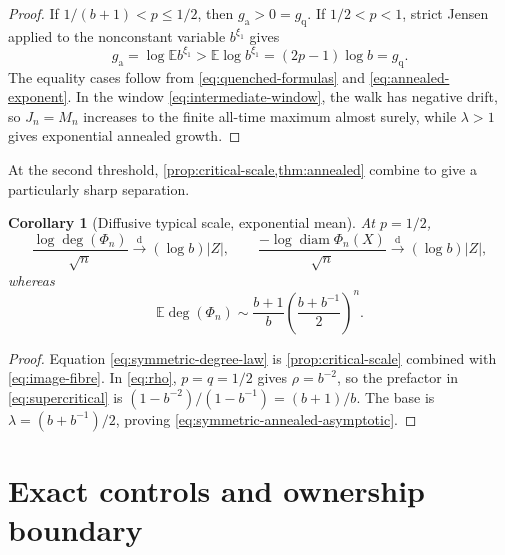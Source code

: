 \documentclass[11pt,a4paper]{amsart}
\newtheorem{corollary}[theorem]{Corollary}
\theoremstyle{definition}
\theoremstyle{remark}
\newcommand{\Exp}{\mathbb E}
\newcommand{\diam}{\operatorname{diam}}
\newcommand{\degf}{\operatorname{deg}}
\begin{document}
\begin{proof}
If $1/(b+1)<p\leq1/2$, then $g_{\mathrm a}>0=g_{\mathrm q}$.  If
$1/2<p<1$, strict Jensen applied to the nonconstant variable
$b^{\xi_1}$ gives
\[
 g_{\mathrm a}=\log\Exp b^{\xi_1}
 >\Exp\log b^{\xi_1}=(2p-1)\log b=g_{\mathrm q}.
\]
The equality cases follow from \eqref{eq:quenched-formulas} and
\eqref{eq:annealed-exponent}.  In the window
\eqref{eq:intermediate-window}, the walk has negative drift, so
$J_n=M_n$ increases to the finite all-time maximum almost surely, while
$\lambda>1$ gives exponential annealed growth.
\end{proof}

At the second threshold, \cref{prop:critical-scale,thm:annealed} combine to
give a particularly sharp separation.

\begin{corollary}[Diffusive typical scale, exponential mean]
\label{cor:symmetric-annealed}
At $p=1/2$,
\begin{equation}\label{eq:symmetric-degree-law}
 \frac{\log\degf(\Phi_n)}{\sqrt n}
 \xrightarrow{\mathrm d}(\log b)|Z|,
 \qquad
 \frac{-\log\diam\Phi_n(X)}{\sqrt n}
 \xrightarrow{\mathrm d}(\log b)|Z|,
\end{equation}
whereas
\begin{equation}\label{eq:symmetric-annealed-asymptotic}
 \Exp\degf(\Phi_n)
 \sim\frac{b+1}{b}
 \left(\frac{b+b^{-1}}2\right)^n.
\end{equation}
\end{corollary}

\begin{proof}
Equation \eqref{eq:symmetric-degree-law} is
\cref{prop:critical-scale} combined with \eqref{eq:image-fibre}.  In
\eqref{eq:rho}, $p=q=1/2$ gives $\rho=b^{-2}$, so the prefactor in
\eqref{eq:supercritical} is
$(1-b^{-2})/(1-b^{-1})=(b+1)/b$.  The base is
$\lambda=(b+b^{-1})/2$, proving
\eqref{eq:symmetric-annealed-asymptotic}.
\end{proof}

\section{Exact controls and ownership boundary}
\label{sec:controls}
\end{document}
